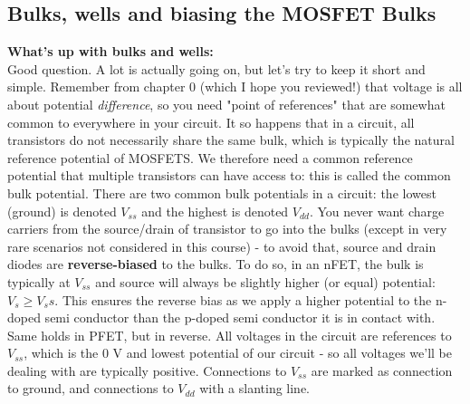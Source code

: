 \subsection{Bulks, wells and biasing the MOSFET Bulks}

\textbf{What's up with bulks and wells:} \\
Good question. A lot is actually going on, but let's try to keep it short and simple. Remember from chapter 0 (which I hope you reviewed!) that voltage is all about potential \emph{difference}, so you need "point of references" that are somewhat common to everywhere in your circuit. It so happens that in a circuit, all transistors do not necessarily share the same bulk, which is typically the natural reference potential of MOSFETS. We therefore need a common reference potential that multiple transistors can have access to: this is called the common bulk potential. There are two common bulk potentials in a circuit: the lowest (ground) is denoted $V_{ss}$ and the highest is denoted $V_{dd}$.
You never want charge carriers from the source/drain of transistor to go into the bulks (except in very rare scenarios not considered in this course) - to avoid that, source and drain diodes are \textbf{reverse-biased} to the bulks. To do so, in an nFET, the bulk is typically at $V_{ss}$ and source will always be slightly higher (or equal) potential: $V_s \geq V_ss$. This ensures the reverse bias as we apply a higher potential to the n-doped semi conductor than the p-doped semi conductor it is in contact with. Same holds in PFET, but in reverse.
All voltages in the circuit are references to $V_{ss}$, which is the 0 V and lowest potential of our circuit - so all voltages we'll be dealing with are typically positive. Connections to $V_{ss}$ are marked as connection to ground, and connections to $V_{dd}$ with a slanting line. 

